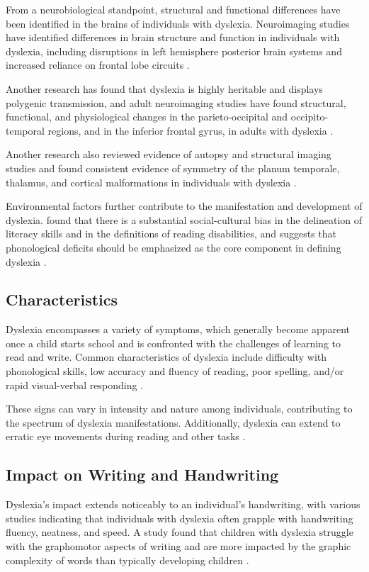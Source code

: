 From a neurobiological standpoint, structural and functional differences have been identified in the brains of individuals with dyslexia. Neuroimaging studies have identified differences in brain structure and function in individuals with dyslexia, including disruptions in left hemisphere posterior brain systems and increased reliance on frontal lobe circuits \parencite{Kearns2019, Norton2015}.

Another research has found that dyslexia is highly heritable and displays polygenic transmission, and adult neuroimaging studies have found structural, functional, and physiological changes in the parieto-occipital and occipito-temporal regions, and in the inferior frontal gyrus, in adults with dyslexia \parencite{SorianoFerrer2017}. 

Another research also reviewed evidence of autopsy and structural imaging studies and found consistent evidence of symmetry of the planum temporale, thalamus, and cortical malformations in individuals with dyslexia \parencite{Wajuihian2011}.

Environmental factors further contribute to the manifestation and development of dyslexia. found that there is a substantial social-cultural bias in the delineation of literacy skills and in the definitions of reading disabilities, and suggests that phonological deficits should be emphasized as the core component in defining dyslexia \parencite{Samuelsson2003}.

\newpage
\subsection{Characteristics}
Dyslexia encompasses a variety of symptoms, which generally become apparent once a child starts school and is confronted with the challenges of learning to read and write. Common characteristics of dyslexia include difficulty with phonological skills, low accuracy and fluency of reading, poor spelling, and/or rapid visual-verbal responding \parencite{Roitsch2019}. 

These signs can vary in intensity and nature among individuals, contributing to the spectrum of dyslexia manifestations. Additionally, dyslexia can extend to erratic eye movements during reading and other tasks \parencite{Pavlidis1981}.

\newpage
\subsection{Impact on Writing and Handwriting}
Dyslexia's impact extends noticeably to an individual's handwriting, with various studies indicating that individuals with dyslexia often grapple with handwriting fluency, neatness, and speed. A study found that children with dyslexia struggle with the graphomotor aspects of writing and are more impacted by the graphic complexity of words than typically developing children \parencite{Gosse2020}. 

